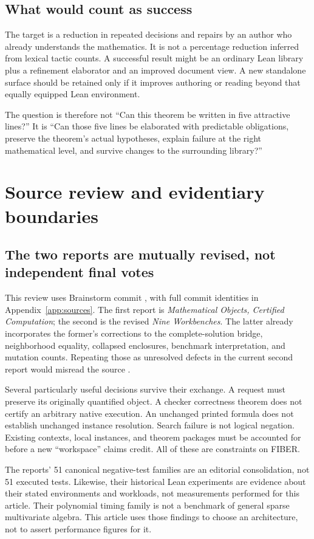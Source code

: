 \documentclass[11pt,letterpaper]{article}
\theoremstyle{definition}\newtheorem{definition}[theorem]{Definition}
\newcommand{\code}[1]{\texttt{\detokenize{#1}}}
\begin{document}
\subsection{What would count as success}
The target is a reduction in repeated decisions and repairs by an author who already understands the mathematics. It is not a percentage reduction inferred from lexical tactic counts. A successful result might be an ordinary Lean library plus a refinement elaborator and an improved document view. A new standalone surface should be retained only if it improves authoring or reading beyond that equally equipped Lean environment.

The question is therefore not ``Can this theorem be written in five attractive lines?'' It is ``Can those five lines be elaborated with predictable obligations, preserve the theorem's actual hypotheses, explain failure at the right mathematical level, and survive changes to the surrounding library?''

\section{Source review and evidentiary boundaries}\label{sec:review}
\subsection{The two reports are mutually revised, not independent final votes}
This review uses Brainstorm commit \code{b052ec01}, with full commit identities in Appendix~\ref{app:sources}. The first report is \emph{Mathematical Objects, Certified Computation}; the second is the revised \emph{Nine Workbenches}. The latter already incorporates the former's corrections to the complete-solution bridge, neighborhood equality, collapsed enclosures, benchmark interpretation, and mutation counts. Repeating those as unresolved defects in the current second report would misread the source \cite{reportA,reportB}.

Several particularly useful decisions survive their exchange. A request must preserve its originally quantified object. A checker correctness theorem does not certify an arbitrary native execution. An unchanged printed formula does not establish unchanged instance resolution. Search failure is not logical negation. Existing contexts, local instances, and theorem packages must be accounted for before a new ``workspace'' claims credit. All of these are constraints on FIBER.

The reports' 51 canonical negative-test families are an editorial consolidation, not 51 executed tests. Likewise, their historical Lean experiments are evidence about their stated environments and workloads, not measurements performed for this article. Their polynomial timing family is not a benchmark of general sparse multivariate algebra. This article uses those findings to choose an architecture, not to assert performance figures for it.
\end{document}
